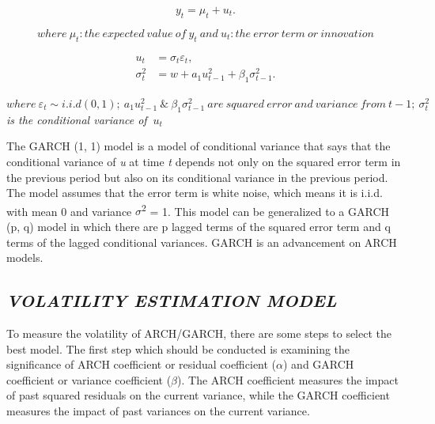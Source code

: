 \documentclass[12pt,a4paper]{report}
\numberwithin{equation}{section}
\begin{document}
\begin{equation}
y_t = \mu_t + u_t.
\label{eq:yt-decomp}
\end{equation}


\[{where\ \mu}_{t}:the\ expected\ value\ of\ y_{t}\ and\ u_{t}:the\ error\ term\ or\ innovation\]

\begin{align}
u_t &= \sigma_t \varepsilon_t, \label{eq:ut}\\
\sigma_t^{2} &= w + a_{1}u_{t-1}^{2} + \beta_{1}\sigma_{t-1}^{2}. \label{eq:garch11}
\end{align}


\(where\ \varepsilon_{t} \sim i.i.d(0,1);\ a_{1}u_{t - 1}^{2}\ \&\ \beta_{1}\sigma_{t - 1}^{2}\ are\ squared\ error\ and\ variance\ from\ t - 1;\ \sigma_{t}^{2}\)
\emph{is the conditional variance of} \({\ u}_{t}\)

The GARCH (1, 1) model is a model of conditional variance that says that
the conditional variance of \emph{u} at time \emph{t} depends not only
on the squared error term in the previous period but also on its
conditional variance in the previous period. The model assumes that the
error term is white noise, which means it is i.i.d. with mean 0 and
variance $\sigma$\textsuperscript{2} = 1. This model can be generalized to a
GARCH (p, q) model in which there are p lagged terms of the squared
error term and q terms of the lagged conditional variances. GARCH is an
advancement on ARCH models.

\hypertarget{volatility--estimation--model}{%
\subsection{\texorpdfstring{\emph{VOLATILITY ESTIMATION
MODEL}}{VOLATILITY ESTIMATION MODEL}}\label{volatility--estimation--model}}

To measure the volatility of ARCH/GARCH, there are some steps to select
the best model. The first step which should be conducted is examining
the significance of ARCH coefficient or residual coefficient ($\alpha$) and
GARCH coefficient or variance coefficient ($\beta$). The ARCH coefficient
measures the impact of past squared residuals on the current variance,
while the GARCH coefficient measures the impact of past variances on the
current variance.
\end{document}
